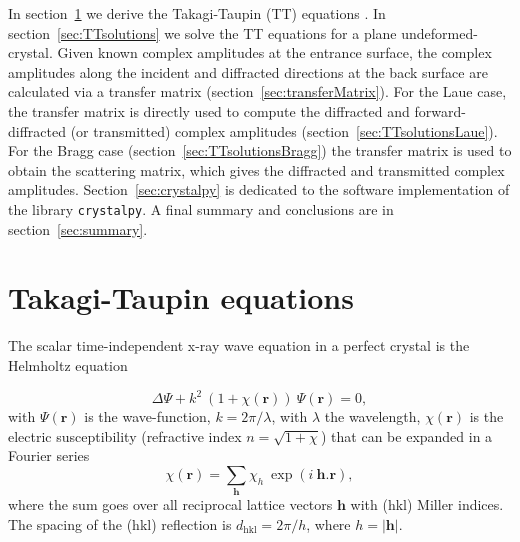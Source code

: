\documentclass{iucr}
\begin{document}
In section~\ref{sec:TT} we derive the Takagi-Taupin (TT) equations \cite{Takagi1962, Taupin, Taupin1967}.
In section~\ref{sec:TTsolutions} we solve the TT equations for a plane undeformed-crystal.
Given known complex amplitudes at the entrance surface, the complex amplitudes along the incident and diffracted directions at the back surface are calculated via a transfer matrix (section~\ref{sec:transferMatrix}). For the Laue case, the transfer matrix is directly used to compute the diffracted and forward-diffracted (or transmitted) complex amplitudes (section~\ref{sec:TTsolutionsLaue}). For the Bragg case (section~\ref{sec:TTsolutionsBragg}) the transfer matrix is used to obtain the scattering matrix, which gives the diffracted and transmitted complex  amplitudes. 
Section~\ref{sec:crystalpy} is dedicated to the software implementation of the library \texttt{crystalpy}. A final summary and conclusions are in section~\ref{sec:summary}.
 
%
\section{Takagi-Taupin equations}
\label{sec:TT}

The scalar time-independent x-ray wave equation in a perfect crystal is the Helmholtz equation

\begin{equation}
\label{eq:helmholz}
    \Delta \Psi + k^2~(1+\chi(\textbf{r})) ~\Psi(\textbf{r}) = 0,
\end{equation}
with $\Psi(\textbf{r})$ is the wave-function, $k=2\pi/\lambda$, with $\lambda$ the wavelength, $\chi(\textbf{r})$ is the electric susceptibility (refractive index $n=\sqrt{1+\chi}$)
that can be expanded in a Fourier series
\begin{equation}
\label{eq:chi}
    \chi(\textbf{r}) = \sum_{\textbf{h}} \chi_h ~\exp(i~\textbf{h} . \textbf{r}),
\end{equation}
where 
the sum goes over all reciprocal lattice vectors $\textbf{h}$ with (hkl) Miller indices. 
The spacing of the (hkl) reflection is $d_\text{hkl}=2 \pi/h$, where $h=|\textbf{h}|$.
\end{document}

